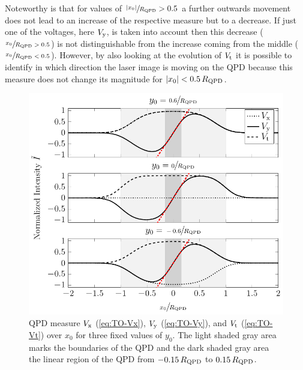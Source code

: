 Noteworthy is that for values of $\sfrac{\abs{x_{0}}}{R_{\mathrm{QPD}}} > 0.5$ a 
further outwards movement does not lead to an increase of the respective 
measure but to a decrease. If just one of the voltages, here $V_{\mathrm{y}}$, is 
taken into account then this decrease ($\sfrac{x_{0}}{R_{\mathrm{QPD}} > 0.5}$) is 
not distinguishable from the increase coming from the middle 
($\sfrac{x_{0}}{R_{\mathrm{QPD}} < 0.5}$).  However, by also looking at the 
evolution of $V_{\mathrm{t}}$ it is possible to identify in which direction the 
laser image is moving on the QPD because this measure does not change its 
magnitude for $\abs{x_{0}} < 0.5\,R_{\mathrm{QPD}} $.

\begin{figure}[tbp]
  \centering
  \includegraphics[]{External/voltages_over_x.pdf}
  \caption{QPD measure $V_{\mathrm{x}}$ (\cref{eq:TO-Vx}), $V_{\mathrm{y}}$
    (\cref{eq:TO-Vy}), and $V_{\mathrm{t}}$ (\cref{eq:TO-Vt}) over $x_{0}$ for 
  three fixed values of $y_{0}$. The light shaded gray area marks the 
boundaries of the QPD and the dark shaded gray area the linear region of the 
QPD from $-0.15\,R_{\mathrm{QPD}}$ to $0.15\,R_{\mathrm{QPD}}$.}
  \label{fig:TO-voltages_over_x}
\end{figure}
